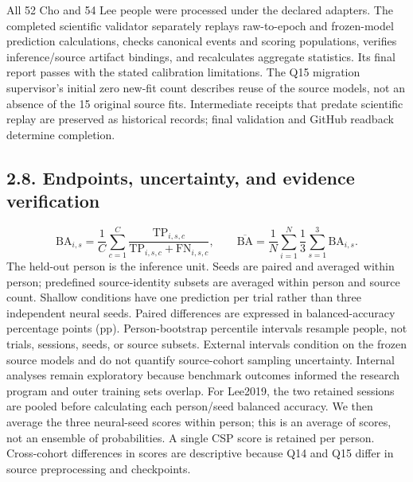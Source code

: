 \documentclass[11pt]{article}
\begin{document}
All 52 Cho and 54 Lee people were processed under the declared adapters. The completed scientific validator separately replays raw-to-epoch and frozen-model prediction calculations, checks canonical events and scoring populations, verifies inference/source artifact bindings, and recalculates aggregate statistics. Its final report passes with the stated calibration limitations. The Q15 migration supervisor's initial zero new-fit count describes reuse of the source models, not an absence of the 15 original source fits. Intermediate receipts that predate scientific replay are preserved as historical records; final validation and GitHub readback determine completion.

\subsection*{2.8. Endpoints, uncertainty, and evidence verification}
\begin{equation*}
\mathrm{BA}_{i,s}=\frac{1}{C}\sum_{c=1}^{C}\frac{\mathrm{TP}_{i,s,c}}{\mathrm{TP}_{i,s,c}+\mathrm{FN}_{i,s,c}},\qquad\overline{\mathrm{BA}}=\frac{1}{N}\sum_{i=1}^{N}\frac{1}{3}\sum_{s=1}^{3}\mathrm{BA}_{i,s}.
\end{equation*}
The held-out person is the inference unit. Seeds are paired and averaged within person; predefined source-identity subsets are averaged within person and source count. Shallow conditions have one prediction per trial rather than three independent neural seeds. Paired differences are expressed in balanced-accuracy percentage points (pp). Person-bootstrap percentile intervals resample people, not trials, sessions, seeds, or source subsets. External intervals condition on the frozen source models and do not quantify source-cohort sampling uncertainty. Internal analyses remain exploratory because benchmark outcomes informed the research program and outer training sets overlap. For Lee2019, the two retained sessions are pooled before calculating each person/seed balanced accuracy. We then average the three neural-seed scores within person; this is an average of scores, not an ensemble of probabilities. A single CSP score is retained per person. Cross-cohort differences in scores are descriptive because Q14 and Q15 differ in source preprocessing and checkpoints.
\end{document}
